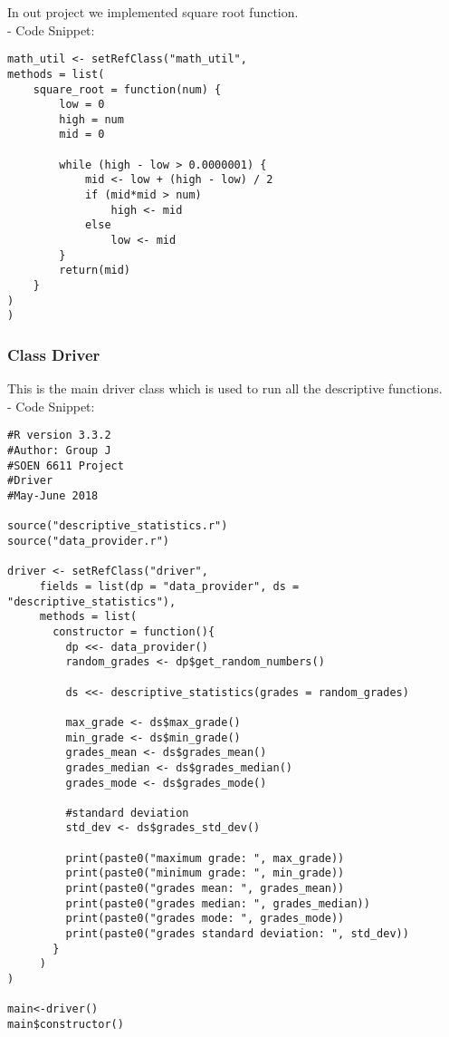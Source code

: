 \documentclass[11pt]{article}
\begin{document}
In out project we implemented square root function.\\

- Code Snippet:\\

\begin{lstlisting}
math_util <- setRefClass("math_util",
methods = list(
    square_root = function(num) {
        low = 0
        high = num
        mid = 0

        while (high - low > 0.0000001) {
            mid <- low + (high - low) / 2
            if (mid*mid > num)
                high <- mid
            else
                low <- mid
        }    
        return(mid)
    }
)
)
\end{lstlisting}

\subsubsection{Class Driver}
This is the main driver class which is used to run all the descriptive functions.\\

- Code Snippet:\\

\begin{lstlisting}
#R version 3.3.2 
#Author: Group J
#SOEN 6611 Project 
#Driver
#May-June 2018

source("descriptive_statistics.r")
source("data_provider.r")

driver <- setRefClass("driver",
     fields = list(dp = "data_provider", ds = "descriptive_statistics"),
     methods = list(
       constructor = function(){
         dp <<- data_provider()
         random_grades <- dp$get_random_numbers()
         
         ds <<- descriptive_statistics(grades = random_grades)
         
         max_grade <- ds$max_grade()
         min_grade <- ds$min_grade()
         grades_mean <- ds$grades_mean()
         grades_median <- ds$grades_median()
         grades_mode <- ds$grades_mode()
         
         #standard deviation
         std_dev <- ds$grades_std_dev()
         
         print(paste0("maximum grade: ", max_grade))
         print(paste0("minimum grade: ", min_grade))
         print(paste0("grades mean: ", grades_mean))
         print(paste0("grades median: ", grades_median))
         print(paste0("grades mode: ", grades_mode))
         print(paste0("grades standard deviation: ", std_dev))
       }
     )
)

main<-driver()
main$constructor()
\end{lstlisting}
\end{document}
